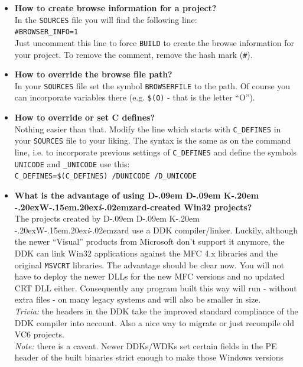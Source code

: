 \documentclass[a4paper,titlepage]{report}
\def\ddkwiz{\texorpdfstring{D\kern-.09em D\kern-.09em K\kern-.20em \raise-.20ex\hbox{W}\kern-.15em\raise.20ex\hbox{\it{i}}\kern-.02em{zard}}{DDKWizard}}
\begin{document}
\begin{itemize}
  \item \textbf{How to create browse information for a project?}\\
        In the \texttt{SOURCES} file you will find the following line:\\
        \verb+#BROWSER_INFO=1+\\
        Just uncomment this line to force \texttt{BUILD} to create
        the browse information for your project. To remove the comment,
        remove the hash mark (\verb+#+).
  \item \textbf{How to override the browse file path?}\\
        In your \texttt{SOURCES} file set the symbol \texttt{BROWSERFILE} to
        the path. Of course you can incorporate variables there (e.g. \verb+$(O)+ - that is the letter ``O'').
  \item \textbf{How to override or set C defines?}\\
        Nothing easier than that. Modify the line which starts with \verb+C_DEFINES+
        in your \texttt{SOURCES} file to your liking. The syntax is the same as on the
        command line, i.e. to incorporate previous settings of \verb+C_DEFINES+
        and define the symbols \verb+UNICODE+ and \verb+_UNICODE+ use this:\\
        \verb+C_DEFINES=$(C_DEFINES) /DUNICODE /D_UNICODE+
  \item \textbf{What is the advantage of using \ddkwiz{}-created Win32 projects?}\\
        The projects created by \ddkwiz{} use a DDK compiler/linker. Luckily, although the
        newer ``Visual'' products from Microsoft don't support it anymore,
        the DDK can link Win32 applications against the MFC 4.x libraries
        and the original \texttt{MSVCRT} libraries. The advantage should be
        clear now. You will not have to deploy the newer DLLs for the new
        MFC versions and no updated CRT DLL either. Consequently any program
        built this way will run - without extra files - on many legacy systems
        and will also be smaller in size.\\
        \emph{Trivia:} the headers in the DDK take the improved standard compliance
        of the DDK compiler into account. Also a nice way to migrate or just
        recompile old VC6 projects.\\
        \emph{Note:} there is a caveat. Newer DDKs/WDKs set certain fields in the
        PE header of the built binaries strict enough to make those Windows versions

\end{itemize}
\end{document}

